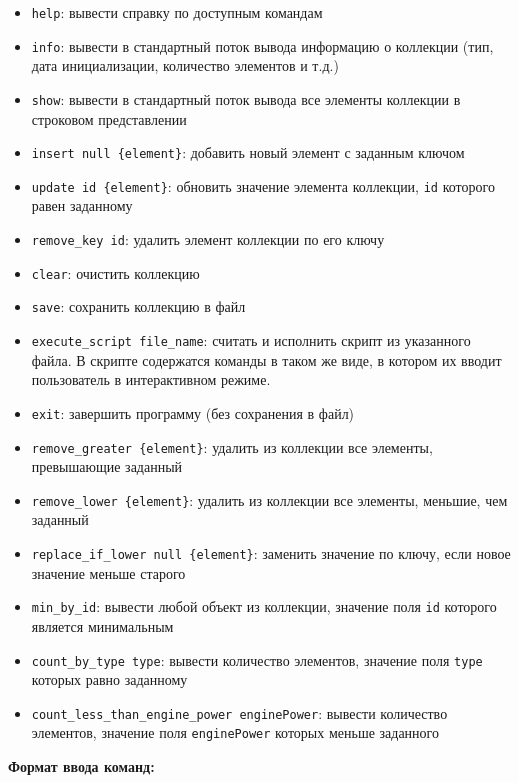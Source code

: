 \begin{itemize}
\item \texttt{help}: вывести справку по доступным командам
\item \texttt{info}: вывести в стандартный поток вывода информацию о коллекции
(тип, дата инициализации, количество элементов и т.д.)
\item \texttt{show}: вывести в стандартный поток вывода все элементы коллекции в строковом представлении
\item \texttt{insert null \{element\}}: добавить новый элемент с заданным ключом
\item \texttt{update id \{element\}}: обновить значение элемента коллекции, \texttt{id} которого
равен заданному
\item \texttt{remove\_key id}: удалить элемент коллекции по его ключу
\item \texttt{clear}: очистить коллекцию
\item \texttt{save}: сохранить коллекцию в файл
\item \texttt{execute\_script file\_name}: считать и исполнить скрипт из указанного файла.
В скрипте содержатся команды в таком же виде, в котором их вводит пользователь в интерактивном режиме.
\item \texttt{exit}: завершить программу (без сохранения в файл)
\item \texttt{remove\_greater \{element\}}: удалить из коллекции все элементы, превышающие заданный
\item \texttt{remove\_lower \{element\}}: удалить из коллекции все элементы, меньшие, чем заданный
\item \texttt{replace\_if\_lower null \{element\}}: заменить значение по ключу, если новое значение меньше старого
\item \texttt{min\_by\_id}: вывести любой объект из коллекции, значение поля \texttt{id}
которого является минимальным
\item \texttt{count\_by\_type type}: вывести количество элементов, значение поля \texttt{type}
которых равно заданному
\item \texttt{count\_less\_than\_engine\_power enginePower}: вывести количество элементов,
значение поля \texttt{enginePower} которых меньше заданного
\end{itemize}


\textbf{Формат ввода команд:}


